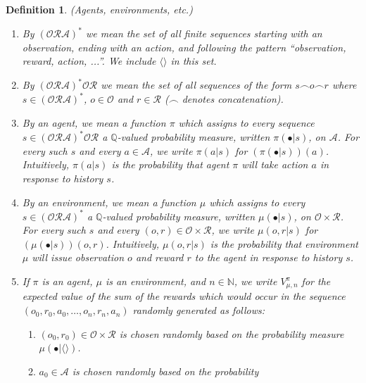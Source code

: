 \documentclass{article}
\newtheorem{definition}[theorem]{Definition}
\begin{document}
\begin{definition}
\label{omnibusdefn}
    (Agents, environments, etc.)
    \begin{enumerate}
        \item
        By $(\mathcal O\mathcal R\mathcal A)^*$ we mean the set of
        all finite sequences starting with an observation, ending with an action,
        and following the pattern ``observation, reward, action, ...''.
        We include $\langle\rangle$ in this set.
        \item
        By $(\mathcal O\mathcal R\mathcal A)^* \mathcal O\mathcal R$
        we mean the set of all sequences of the form $s\frown o\frown r$ where
        $s\in (\mathcal O\mathcal R\mathcal A)^*$, $o\in\mathcal O$
        and $r\in\mathcal R$ ($\frown$ denotes concatenation).
        \item
        By an \emph{agent}, we mean a function $\pi$ which assigns to every sequence
        $s\in (\mathcal O\mathcal R\mathcal A)^* \mathcal O\mathcal R$ a $\mathbb Q$-valued probability measure,
        written $\pi(\bullet|s)$, on $\mathcal A$.
        For every such $s$ and every $a\in\mathcal A$,
        we write $\pi(a|s)$ for $(\pi(\bullet|s))(a)$.
        Intuitively, $\pi(a|s)$ is the probability that agent $\pi$
        will take action $a$ in response to history $s$.
        \item
        By an \emph{environment}, we mean a function $\mu$
        which assigns to every
        $s\in (\mathcal O\mathcal R\mathcal A)^*$
        a $\mathbb Q$-valued probability measure,
        written $\mu(\bullet|s)$,
        on $\mathcal O\times\mathcal R$.
        For every such $s$ and every $(o,r)\in\mathcal O\times\mathcal R$,
        we write $\mu(o,r|s)$ for $(\mu(\bullet|s))(o,r)$.
        Intuitively, $\mu(o,r|s)$ is the probability that environment
        $\mu$ will issue observation $o$ and reward $r$ to the agent in response
        to history $s$.
        \item
        If $\pi$ is an agent, $\mu$ is an environment, and $n\in\mathbb N$,
        we write $V^\pi_{\mu,n}$ for the expected value of the sum of
        the rewards which would occur in the sequence
        $(o_0,r_0,a_0,\ldots,o_n,r_n,a_n)$ randomly generated as follows:
        \begin{enumerate}
            \item $(o_0,r_0)\in \mathcal O\times\mathcal R$ is chosen randomly based
            on the probability measure $\mu(\bullet|\langle\rangle)$.
            \item $a_0\in\mathcal A$ is chosen randomly based on the probability

\end{enumerate}
\end{enumerate}
\end{definition}
\end{document}
